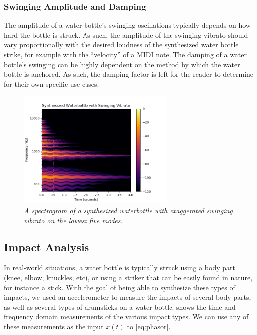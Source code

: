\documentclass[twoside,a4paper]{article}
\begin{document}
\subsubsection{Swinging Amplitude and Damping}
%
The amplitude of a water bottle's swinging oscillations typically depends
on how hard the bottle is struck. As such, the amplitude of the swinging
vibrato should vary proportionally with the desired loudness of the synthesized water bottle strike, for example with the ``velocity'' of a MIDI note.
The damping of a water bottle's swinging can be highly dependent on the method
by which the water bottle is anchored. As such, the damping factor is left
for the reader to determine for their own specific use cases.
%
\begin{figure}
    \centering
    \includegraphics[width=3in]{../Figures/Specgrams/Vibrato.png}
    \caption{\it{A spectrogram of a synthesized waterbottle with exaggerated swinging vibrato on the lowest five modes.}}
    \label{fig:swinging-vibrato}
\end{figure}

%
\subsection{Impact Analysis} \label{sec:impact}
%
In real-world situations, a water bottle is typically struck using a body part
(knee, elbow, knuckles, etc), or using a striker that can be easily found in
nature, for instance a stick. With the goal of being able to synthesize these
types of impacts, we used an accelerometer to measure the impacts of
several body parts, as well as several types of drumsticks on a water bottle.
 shows the time and frequency domain
measurements of the various impact types. We can use any of these measurements as the input $x(t)$ to \eqref{eq:phasor}.
\end{document}
